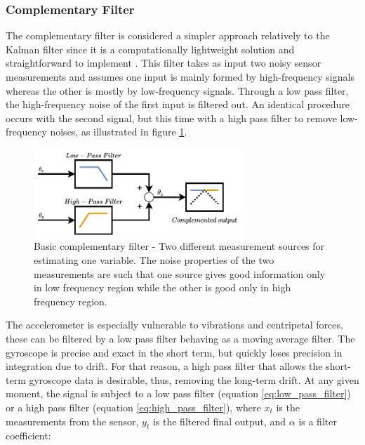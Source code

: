 \subsubsection{Complementary Filter}

The complementary filter is considered a simpler approach relatively to the Kalman filter since it is a computationally lightweight solution and straightforward to implement \cite{higgins1975comparison}. This filter takes as input two noisy sensor measurements and assumes one input is mainly formed by high-frequency signals whereas the other is mostly by low-frequency signals. Through a low pass filter, the high-frequency noise of the first input is filtered out. An identical procedure occurs with the second signal, but this time with a high pass filter to remove low-frequency noises, as illustrated in figure \ref{fig:complementary}.

\begin{figure}[!h]
    \centering
    \includegraphics[width=0.7\textwidth]{figures/complementary.pdf}
    \caption{Basic complementary filter \cite{higgins1975comparison} - Two different measurement sources for estimating one variable. The noise properties of the two measurements are such that one source gives good information only in low frequency region while the other is good only in high frequency region. }
    \label{fig:complementary}
\end{figure}

The accelerometer is especially vulnerable to vibrations and centripetal forces, these can be filtered by a low pass filter behaving as a moving average filter. The gyroscope is precise and exact in the short term, but quickly loses precision in integration due to drift. For that reason, a high pass filter that allows the short-term gyroscope data is desirable, thus, removing the long-term drift.
At any given moment, the signal is subject to a low pass filter (equation \ref{eq:low_pass_filter}) or a high pass filter (equation \ref{eq:high_pass_filter}), where $x_t$ is the measurements from the sensor, $y_t$ is the filtered final output, and $\alpha$ is a filter coefficient:

